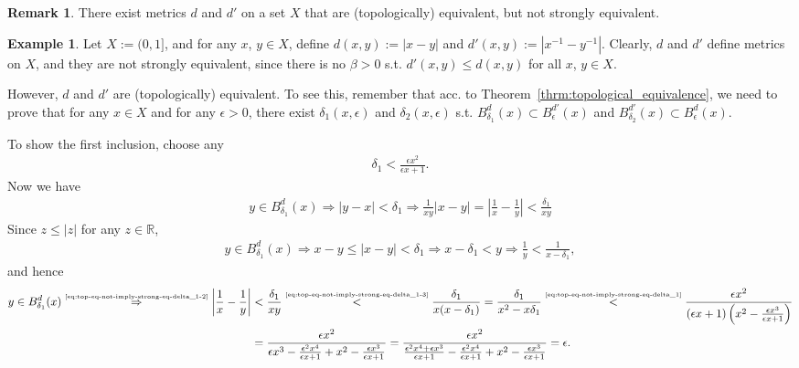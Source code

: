 \documentclass[12pt, a4paper]{article}
\numberwithin{equation}{section}
\theoremstyle{definition}
\theoremstyle{definition}
\newtheorem{exmp}[thm]{Example} %
\newtheorem{remark}[thm]{Remark} %
\newcommand{\abs}[1]{\left\vert #1 \right\vert}
\begin{document}
	\begin{remark}
		There exist metrics $d$ and $d'$ on a set $X$ that are (topologically) equivalent, but not strongly equivalent. \cite{5065146}
	\end{remark}

	\begin{exmp}
		Let $X := (0, 1]$, and for any $x$, $y\in X$, define $d(x, y) := \abs{x - y}$ and \newline $d'(x, y) := \abs{x^{-1} - y^{-1}}$. Clearly, $d$ and $d'$ define metrics on $X$, and they are not strongly equivalent, since there is no $\beta > 0$ s.t. $d'(x, y) \leq d(x, y)$ for all $x$, $y\in X$. 
		
		However, $d$ and $d'$ are (topologically) equivalent. To see this, remember that acc. to \mbox{Theorem \ref{thrm:topological_equivalence}}, we need to prove that for any $x\in X$ and for any $\epsilon > 0$, there exist $\delta_{1}(x, \epsilon)$ and $\delta_2(x, \epsilon)$ s.t. $B_{\delta_1}^{d}(x) \subset B_{\epsilon}^{d'}(x)$ and $B_{\delta_2}^{d'}(x) \subset B_{\epsilon}^{d}(x)$. 
		
		To show the first inclusion, choose any
		\begin{align}\label{eq:top-eq-not-imply-strong-eq-delta_1}
			\delta_{1} < \frac{\epsilon x^2}{\epsilon x + 1}.
		\end{align}
		Now we have 
		\begin{align}\label{eq:top-eq-not-imply-strong-eq-delta_1-2}
			y \in B_{\delta_1}^{d}(x) \Rightarrow \abs{y - x} < \delta_1 \Rightarrow \frac{1}{xy}\abs{x - y} = \abs{\frac{1}{x} - \frac{1}{y}} < \frac{\delta_1}{xy}
		\end{align}
		Since $z \leq \abs{z}$ for any $z\in\mathbb R$, 
		\begin{align}\label{eq:top-eq-not-imply-strong-eq-delta_1-3}
			y \in B_{\delta_1}^{d}(x) \Rightarrow x - y \leq \abs{x-y} < \delta_1 \Rightarrow x - \delta_1 < y\Rightarrow \frac{1}{y} < \frac{1}{x - \delta_1},
		\end{align}
		and hence 
		\begin{align}
			y \in B_{\delta_1}^{d}(x) \overset{\tiny \eqref{eq:top-eq-not-imply-strong-eq-delta_1-2}}{\Rightarrow} \abs{\frac{1}{x} - \frac{1}{y}} &< \frac{\delta_1}{xy} \overset{\tiny \eqref{eq:top-eq-not-imply-strong-eq-delta_1-3}}{<} \frac{\delta_1}{x(x - \delta_1)} = \frac{\delta_1}{x^2 - x\delta_1} \overset{\tiny \eqref{eq:top-eq-not-imply-strong-eq-delta_1}}{<} \frac{\epsilon x^2}{\left(\epsilon x + 1\right)\left(x^2 - \frac{\epsilon x^3}{\epsilon x + 1}\right)} 
			\\ &= \frac{\epsilon x^2}{\epsilon x^3 - \frac{\epsilon^2 x^4}{\epsilon x + 1} + x^2 - \frac{\epsilon x^3}{\epsilon x + 1}} = \frac{\epsilon x^2}{\frac{\epsilon^2 x^4 + \epsilon x^3}{\epsilon x + 1} - \frac{\epsilon^2 x^4}{\epsilon x + 1} + x^2 - \frac{\epsilon x^3}{\epsilon x + 1}} = \epsilon.
		\end{align}
		

\end{exmp}
\end{document}
